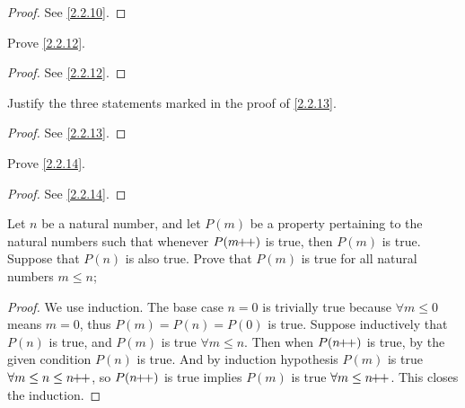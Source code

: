 \begin{proof}
  See \cref{2.2.10}.
\end{proof}

\begin{ex}\label{ex:2.2.3}
  Prove \cref{2.2.12}.
\end{ex}

\begin{proof}
  See \cref{2.2.12}.
\end{proof}

\begin{ex}\label{ex:2.2.4}
  Justify the three statements marked in the proof of \cref{2.2.13}.
\end{ex}

\begin{proof}
  See \cref{2.2.13}.
\end{proof}

\begin{ex}\label{ex:2.2.5}
  Prove \cref{2.2.14}.
\end{ex}

\begin{proof}
  See \cref{2.2.14}.
\end{proof}

\begin{ex}\label{ex:2.2.6}
  Let \(n\) be a natural number, and let \(P(m)\) be a property pertaining to the natural numbers such that whenever \(P(m\!\!+\!\!+)\) is true, then \(P(m)\) is true.
  Suppose that \(P(n)\) is also true.
  Prove that \(P(m)\) is true for all natural numbers \(m \leq n\);
\end{ex}

\begin{proof}
  We use induction.
  The base case \(n = 0\) is trivially true because \(\forall m \leq 0\) means \(m = 0\), thus \(P(m) = P(n) = P(0)\) is true.
  Suppose inductively that \(P(n)\) is true, and \(P(m)\) is true \(\forall m \leq n\).
  Then when \(P(n\!\!+\!\!+)\) is true, by the given condition \(P(n)\) is true.
  And by induction hypothesis \(P(m)\) is true \(\forall m \leq n \leq n\!\!+\!\!+\), so \(P(n\!\!+\!\!+)\) is true implies \(P(m)\) is true \(\forall m \leq n\!\!+\!\!+\).
  This closes the induction.
\end{proof}